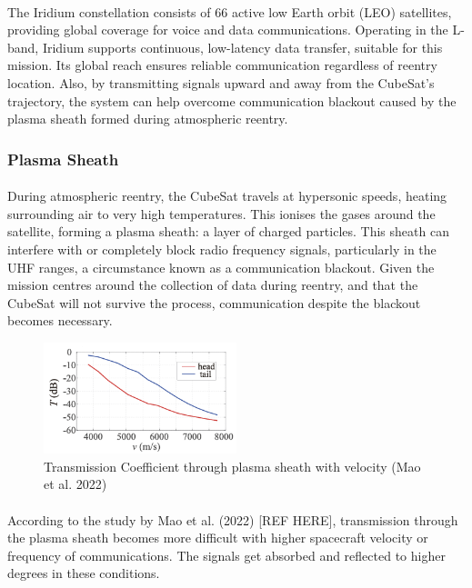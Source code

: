 \documentclass[11pt]{article}
\begin{document}
	\paragraph{} The Iridium constellation consists of 66 active low Earth orbit (LEO) satellites, providing global coverage for voice and data communications. Operating in the L-band, Iridium supports continuous, low-latency data transfer, suitable for this mission. Its global reach ensures reliable communication regardless of reentry location. Also, by transmitting signals upward and away from the CubeSat’s trajectory, the system can help overcome communication blackout caused by the plasma sheath formed during atmospheric reentry.
	
	\subsubsection{Plasma Sheath}
	
	\paragraph{} During atmospheric reentry, the CubeSat travels at hypersonic speeds, heating surrounding air to very high temperatures. This ionises the gases around the satellite, forming a plasma sheath: a layer of charged particles. This sheath can interfere with or completely block radio frequency signals, particularly in the UHF ranges, a circumstance known as a communication blackout. Given the mission centres around the collection of data during reentry, and that the CubeSat will not survive the process, communication despite the blackout becomes necessary. 
	
	\begin{figure}[H]
		\centering
		\includegraphics[width=0.5\textwidth]{TransVel.png}
		\caption{Transmission Coefficient through plasma sheath with velocity (Mao et al. 2022)}
	\end{figure}
	
	\paragraph{}According to the study by Mao et al. (2022) [REF HERE], transmission through the plasma sheath becomes more difficult with higher spacecraft velocity or frequency of communications. The signals get absorbed and reflected to higher degrees in these conditions.
	
\end{document}
